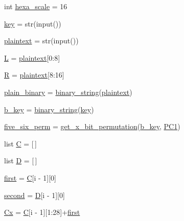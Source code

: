 \begin{DoxyCompactItemize}
\item 
int \hyperlink{namespaceDESKeygen_ac3b4d157f3aa8ee5cf421bc8f39f0442}{hexa\+\_\+scale} = 16
\item 
\hyperlink{namespaceDESKeygen_af43f014fafd9b989e2bc32538d373ed2}{key} = str(input())
\item 
\hyperlink{namespaceDESKeygen_a2a0821ea3c5c35ce080f9935767b441b}{plaintext} = str(input())
\item 
\hyperlink{namespaceDESKeygen_aab60c41d9b210880b1939c4a61c98c1d}{L} = \hyperlink{namespaceDESKeygen_a2a0821ea3c5c35ce080f9935767b441b}{plaintext}\mbox{[}0\+:8\mbox{]}
\item 
\hyperlink{namespaceDESKeygen_a5e6262e2d5b5d262809ce5fac81261ac}{R} = \hyperlink{namespaceDESKeygen_a2a0821ea3c5c35ce080f9935767b441b}{plaintext}\mbox{[}8\+:16\mbox{]}
\item 
\hyperlink{namespaceDESKeygen_a493d3c517f0465c6e02e159d6fc7698e}{plain\+\_\+binary} = \hyperlink{namespaceDESKeygen_a84313d066275cfa7748f56adc4405def}{binary\+\_\+string}(\hyperlink{namespaceDESKeygen_a2a0821ea3c5c35ce080f9935767b441b}{plaintext})
\item 
\hyperlink{namespaceDESKeygen_a306ed33120176dbe79619181f9879730}{b\+\_\+key} = \hyperlink{namespaceDESKeygen_a84313d066275cfa7748f56adc4405def}{binary\+\_\+string}(\hyperlink{namespaceDESKeygen_af43f014fafd9b989e2bc32538d373ed2}{key})
\item 
\hyperlink{namespaceDESKeygen_aac37a8b4dd18161457399781c486f483}{five\+\_\+six\+\_\+perm} = \hyperlink{namespaceDESKeygen_a54842a0190e5d94c214033d9d9b8acfe}{get\+\_\+x\+\_\+bit\+\_\+permutation}(\hyperlink{namespaceDESKeygen_a306ed33120176dbe79619181f9879730}{b\+\_\+key}, \hyperlink{namespaceDESKeygen_ad9fa6cbd0839d08d29221becb47ac2ba}{P\+C1})
\item 
list \hyperlink{namespaceDESKeygen_a393699eacc46d06903f450fee13ab916}{C} = \mbox{[}$\,$\mbox{]}
\item 
list \hyperlink{namespaceDESKeygen_a4618ae9ac43c9af4a7a018eae1507c3c}{D} = \mbox{[}$\,$\mbox{]}
\item 
\hyperlink{namespaceDESKeygen_a275c92bf74886b149e31075ed4f24871}{first} = \hyperlink{namespaceDESKeygen_a393699eacc46d06903f450fee13ab916}{C}\mbox{[}i -\/ 1\mbox{]}\mbox{[}0\mbox{]}
\item 
\hyperlink{namespaceDESKeygen_a90b4cb951d052552ff184daf0e2428b2}{second} = \hyperlink{namespaceDESKeygen_a4618ae9ac43c9af4a7a018eae1507c3c}{D}\mbox{[}i -\/ 1\mbox{]}\mbox{[}0\mbox{]}
\item 
\hyperlink{namespaceDESKeygen_a0236231f847a50ccf8bb110023c5e22d}{Cx} = \hyperlink{namespaceDESKeygen_a393699eacc46d06903f450fee13ab916}{C}\mbox{[}i -\/ 1\mbox{]}\mbox{[}1\+:28\mbox{]}+\hyperlink{namespaceDESKeygen_a275c92bf74886b149e31075ed4f24871}{first}

\end{DoxyCompactItemize}
